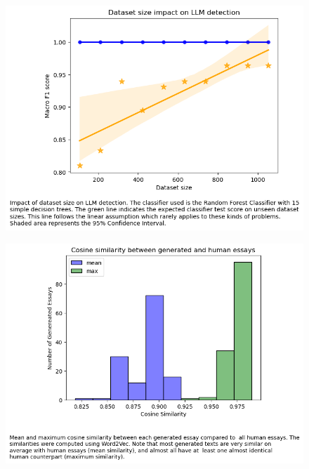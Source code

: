 \documentclass[11pt, a4paper]{article}
\begin{document}
	\begin{figure}
		\includegraphics[width=14cm]{dataset_size.png}
		\centering
		\label{fig::dataset_size}
	\end{figure}
	
	\begin{figure}
		\includegraphics[width=14cm]{similarity.png}
		\centering
		\label{fig::similarity}
	\end{figure}
\end{document}
